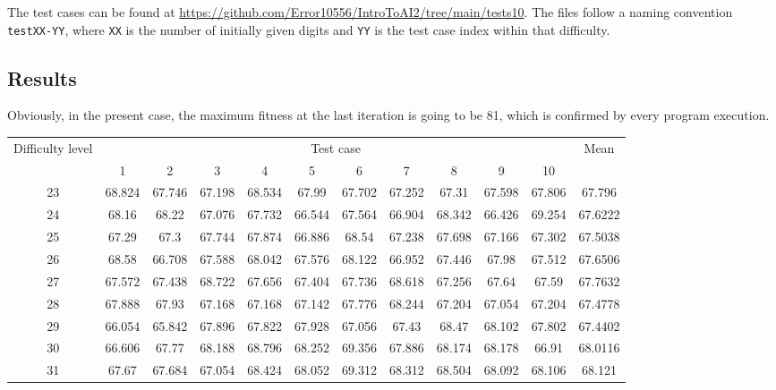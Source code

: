 \documentclass[10pt]{article}
\begin{document}
The test cases can be found at \url{https://github.com/Error10556/IntroToAI2/tree/main/tests10}.
The files follow a naming convention \texttt{testXX-YY}, where \texttt{XX} is the number
of initially given digits and \texttt{YY} is the test case index within that difficulty.

\subsection{Results}

Obviously, in the present case, the maximum fitness at the last iteration is going to be 81, which
is confirmed by every program execution.

\begin{table}[t]
    \begin{center}
        \begin{tabular}{|c|c|c|c|c|c|c|c|c|c|c|c|}
            \hline
            \multirow{2}{2.25cm}{Difficulty level} & \multicolumn{10}{c|}{Test case} & \multirow{2}{1.3cm}{Mean} \\\cline{2-11}
            & 1 & 2 & 3 & 4 & 5 & 6 & 7 & 8 & 9 & 10 &\\\hline
            23 & 68.824 & 67.746 & 67.198 & 68.534 & 67.99 & 67.702 & 67.252 & 67.31 & 67.598 & 67.806 & 67.796\\\hline
            24 & 68.16 & 68.22 & 67.076 & 67.732 & 66.544 & 67.564 & 66.904 & 68.342 & 66.426 & 69.254 & 67.6222\\\hline
            25 & 67.29 & 67.3 & 67.744 & 67.874 & 66.886 & 68.54 & 67.238 & 67.698 & 67.166 & 67.302 & 67.5038\\\hline
            26 & 68.58 & 66.708 & 67.588 & 68.042 & 67.576 & 68.122 & 66.952 & 67.446 & 67.98 & 67.512 & 67.6506\\\hline
            27 & 67.572 & 67.438 & 68.722 & 67.656 & 67.404 & 67.736 & 68.618 & 67.256 & 67.64 & 67.59 & 67.7632\\\hline
            28 & 67.888 & 67.93 & 67.168 & 67.168 & 67.142 & 67.776 & 68.244 & 67.204 & 67.054 & 67.204 & 67.4778\\\hline
            29 & 66.054 & 65.842 & 67.896 & 67.822 & 67.928 & 67.056 & 67.43 & 68.47 & 68.102 & 67.802 & 67.4402\\\hline
            30 & 66.606 & 67.77 & 68.188 & 68.796 & 68.252 & 69.356 & 67.886 & 68.174 & 68.178 & 66.91 & 68.0116\\\hline
            31 & 67.67 & 67.684 & 67.054 & 68.424 & 68.052 & 69.312 & 68.312 & 68.504 & 68.092 & 68.106 & 68.121\\\hline

\end{tabular}
\end{center}
\end{table}
\end{document}
